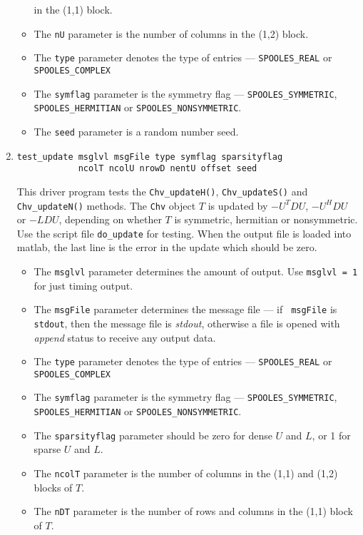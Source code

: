\begin{enumerate}
\begin{itemize}
in the (1,1) block.
\item
The {\tt nU} parameter is the number of columns 
in the (1,2) block.
\item
The {\tt type} parameter denotes the type of entries ---
{\tt SPOOLES\_REAL} or {\tt SPOOLES\_COMPLEX} 
\item
The {\tt symflag} parameter is the symmetry flag ---
{\tt SPOOLES\_SYMMETRIC}, {\tt SPOOLES\_HERMITIAN}
or {\tt SPOOLES\_NONSYMMETRIC}.
\item
The {\tt seed} parameter is a random number seed.
\end{itemize}
\item
\begin{verbatim}
test_update msglvl msgFile type symflag sparsityflag
            ncolT ncolU nrowD nentU offset seed 
\end{verbatim}
This driver program tests the 
{\tt Chv\_updateH()},
{\tt Chv\_updateS()} and
{\tt Chv\_updateN()} methods.
The {\tt Chv} object $T$ is updated by $-U^TDU$, $-U^HDU$ or $-LDU$, 
depending on whether $T$ is symmetric, hermitian or nonsymmetric.
Use the script file {\tt do\_update} for testing.
When the output file is loaded into matlab,
the last line is the error in the update which should be zero.
\par
\begin{itemize}
\item
The {\tt msglvl} parameter determines the amount of output.
Use {\tt msglvl = 1} for just timing output.
\item
The {\tt msgFile} parameter determines the message file --- if {\tt
msgFile} is {\tt stdout}, then the message file is {\it stdout},
otherwise a file is opened with {\it append} status to receive any
output data.
\item
The {\tt type} parameter denotes the type of entries ---
{\tt SPOOLES\_REAL} or {\tt SPOOLES\_COMPLEX} 
\item
The {\tt symflag} parameter is the symmetry flag ---
{\tt SPOOLES\_SYMMETRIC}, {\tt SPOOLES\_HERMITIAN}
or {\tt SPOOLES\_NONSYMMETRIC}.
\item
The {\tt sparsityflag} parameter should be zero for dense $U$ and $L$,
or 1 for sparse $U$ and $L$.
\item
The {\tt ncolT} parameter is the number of columns 
in the (1,1) and (1,2) blocks of $T$.
\item
The {\tt nDT} parameter is the number of rows and columns 
in the (1,1) block of $T$.

\end{itemize}
\end{enumerate}
